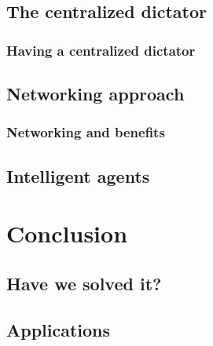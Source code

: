 \documentclass[aspectratio=169]{beamer}
\begin{document}
\subsection{The centralized dictator}

\begin{frame}
    \frametitle{Having a centralized dictator}


\end{frame}

\subsection{Networking approach}

\begin{frame}
    \frametitle{Networking and benefits}

    

\end{frame}

\subsection{Intelligent agents}

\section{Conclusion}

\subsection{Have we solved it?}

\subsection{Applications}



%     
%     
    
\end{document}
